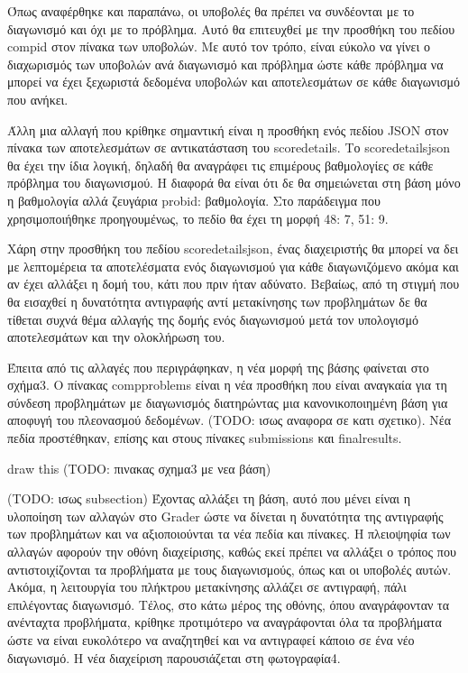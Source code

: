 \documentclass[diploma]{softlab-thesis}
\begin{document}
Όπως αναφέρθηκε και παραπάνω, οι υποβολές θα πρέπει να συνδέονται με το
διαγωνισμό και όχι με το πρόβλημα. Αυτό θα επιτευχθεί με την προσθήκη του
πεδίου compid στον πίνακα των υποβολών. Με αυτό τον τρόπο, είναι εύκολο να
γίνει ο διαχωρισμός των υποβολών ανά διαγωνισμό και πρόβλημα ώστε κάθε πρόβλημα
να μπορεί να έχει ξεχωριστά δεδομένα υποβολών και αποτελεσμάτων σε κάθε
διαγωνισμό που ανήκει.

\bigskip

Άλλη μια αλλαγή που κρίθηκε σημαντική είναι η προσθήκη ενός πεδίου JSON στον
πίνακα των αποτελεσμάτων σε αντικατάσταση του scoredetails. Το scoredetailsjson
θα έχει την ίδια λογική, δηλαδή θα αναγράφει τις επιμέρους βαθμολογίες σε κάθε
πρόβλημα του διαγωνισμού. Η διαφορά θα είναι ότι δε θα σημειώνεται στη βάση μόνο
η βαθμολογία αλλά ζευγάρια probid: βαθμολογία. Στο παράδειγμα που χρησιμοποιήθηκε
προηγουμένως, το πεδίο θα έχει τη μορφή {48: 7, 51: 9}.

\bigskip

Χάρη στην προσθήκη του πεδίου scoredetailsjson, ένας διαχειριστής θα μπορεί να δει
με λεπτομέρεια τα αποτελέσματα ενός διαγωνισμού για κάθε διαγωνιζόμενο ακόμα και
αν έχει αλλάξει η δομή του, κάτι που πριν ήταν αδύνατο. Βεβαίως, από τη στιγμή που
θα εισαχθεί η δυνατότητα αντιγραφής αντί μετακίνησης των προβλημάτων δε θα τίθεται
συχνά θέμα αλλαγής της δομής ενός διαγωνισμού μετά τον υπολογισμό αποτελεσμάτων και
την ολοκλήρωση του.

\bigskip

Έπειτα από τις αλλαγές που περιγράφηκαν, η νέα μορφή της βάσης φαίνεται στο σχήμα3.
Ο πίνακας compproblems είναι η νέα προσθήκη που είναι αναγκαία για τη σύνδεση
προβλημάτων με διαγωνισμός διατηρώντας μια κανονικοποιημένη βάση για αποφυγή του
πλεονασμού δεδομένων. (TODO: ισως αναφορα σε κατι σχετικο). Νέα πεδία προστέθηκαν,
επίσης και στους πίνακες submissions και finalresults.

\bigskip

draw this
(TODO: πινακας σχημα3 με νεα βάση)

\bigskip

(TODO: ισως subsection) Έχοντας αλλάξει τη βάση, αυτό που μένει είναι η
υλοποίηση των αλλαγών στο Grader ώστε να δίνεται η δυνατότητα της αντιγραφής
των προβλημάτων και να αξιοποιούνται τα νέα πεδία και πίνακες. Η πλειοψηφία των
αλλαγών αφορούν την οθόνη διαχείρισης, καθώς εκεί πρέπει να αλλάξει ο τρόπος
που αντιστοιχίζονται τα προβλήματα με τους διαγωνισμούς, όπως και οι υποβολές
αυτών. Ακόμα, η λειτουργία του πλήκτρου μετακίνησης αλλάζει σε αντιγραφή, πάλι
επιλέγοντας διαγωνισμό. Τέλος, στο κάτω μέρος της οθόνης, όπου αναγράφονταν τα
ανένταχτα προβλήματα, κρίθηκε προτιμότερο να αναγράφονται όλα τα προβλήματα
ώστε να είναι ευκολότερο να αναζητηθεί και να αντιγραφεί κάποιο σε ένα νέο
διαγωνισμό. Η νέα διαχείριση παρουσιάζεται στη φωτογραφία4.
\end{document}
